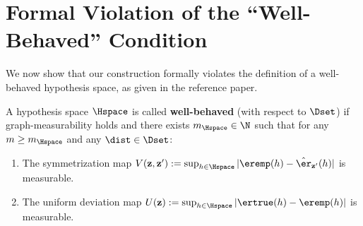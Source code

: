 \section{Formal Violation of the ``Well-Behaved'' Condition}

We now show that our construction formally violates the definition of a well-behaved hypothesis space, as given in the reference paper.

\begin{definition}
    A hypothesis space $\Hspace$ is called \textbf{well-behaved} (with respect to $\Dset$) if graph-measurability holds and there exists $m_\Hspace \in \N$ such that for any $m \ge m_\Hspace$ and any $\dist \in \Dset$:
    \begin{enumerate}
        \item The symmetrization map $V(\mathbf{z}, \mathbf{z}') := \sup_{h\in\Hspace} |\eremp(h) - \hat{\er}_{\mathbf{z}'}(h)|$ is measurable.
        \item The uniform deviation map $U(\mathbf{z}) := \sup_{h\in\Hspace} |\ertrue(h) - \eremp(h)|$ is measurable.
    \end{enumerate}
\end{definition}


